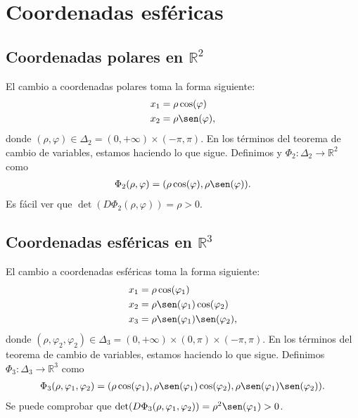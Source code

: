 \section{Coordenadas esféricas}

\subsection{Coordenadas polares en $\mathbb{R}^2$}

El cambio a coordenadas polares toma la forma siguiente:
\begin{align*}
    x_1 &= \rho \cos(\varphi) \\ 
    x_2 &= \rho \sen(\varphi),
\end{align*}
donde $(\rho, \varphi) \in \Delta_2 = (0,+\infty)\times(-\pi,\pi)$. En los términos del teorema de cambio de variables, estamos haciendo lo que sigue. Definimos y $\Phi_2 : \Delta_2 \longrightarrow \mathbb{R}^2$ como
\begin{align*}
    \Phi_2(\rho, \varphi) = (\rho \cos(\varphi), \rho \sen(\varphi)).
\end{align*}
Es fácil ver que $\det(D\Phi_2(\rho, \varphi)) = \rho > 0$.

\subsection{Coordenadas esféricas en $\mathbb{R}^3$}
El cambio a coordenadas esféricas toma la forma siguiente:
\begin{align*}
    x_1 &= \rho \cos(\varphi_1) \\
    x_2 &= \rho \sen(\varphi_1) \cos(\varphi_2) \\
    x_3 &= \rho \sen(\varphi_1) \sen(\varphi_2), 
\end{align*}
donde $(\rho, \varphi_2, \varphi_2) \in \Delta_3 = (0,+\infty)\times(0,\pi)\times(-\pi,\pi)$. En los términos del teorema de cambio de variables, estamos haciendo lo que sigue. Definimos $\Phi_3 : \Delta_3 \longrightarrow \mathbb{R}^3$ como
\begin{align*}
    \Phi_3(\rho, \varphi_1, \varphi_2) = (\rho \cos(\varphi_1), \rho \sen(\varphi_1) \cos(\varphi_2), \rho \sen(\varphi_1) \sen(\varphi_2)).
\end{align*}
Se puede comprobar que $\det(D\Phi_3(\rho, \varphi_1, \varphi_2)) = \rho^2 \sen(\varphi_1) > 0$.

